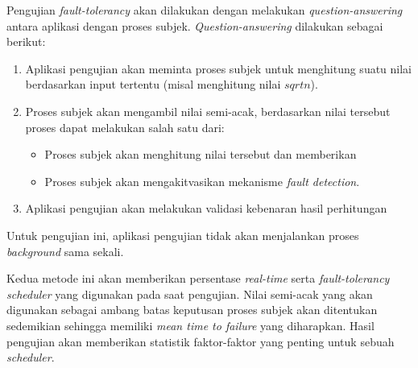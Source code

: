 Pengujian \textit{fault-tolerancy} akan dilakukan dengan melakukan \textit{question-answering} antara aplikasi dengan proses subjek.
\textit{Question-answering} dilakukan sebagai berikut:
\begin{enumerate}
    \item Aplikasi pengujian akan meminta proses subjek untuk menghitung suatu nilai berdasarkan input tertentu (misal menghitung nilai $sqrt{n}$).
    \item Proses subjek akan mengambil nilai semi-acak, berdasarkan nilai tersebut proses dapat melakukan salah satu dari:
        \begin{itemize}
            \item Proses subjek akan menghitung nilai tersebut dan memberikan
            \item Proses subjek akan mengakitvasikan mekanisme \textit{fault detection}.
        \end{itemize}
    \item Aplikasi pengujian akan melakukan validasi kebenaran hasil perhitungan
\end{enumerate}
Untuk pengujian ini, aplikasi pengujian tidak akan menjalankan proses \textit{background} sama sekali.

Kedua metode ini akan memberikan persentase \textit{real-time} serta \textit{fault-tolerancy} \textit{scheduler} yang digunakan pada saat pengujian.
Nilai semi-acak yang akan digunakan sebagai ambang batas keputusan proses subjek akan ditentukan sedemikian sehingga memiliki \textit{mean time to failure} yang diharapkan.
Hasil pengujian akan memberikan statistik faktor-faktor yang penting untuk sebuah \textit{scheduler}.

